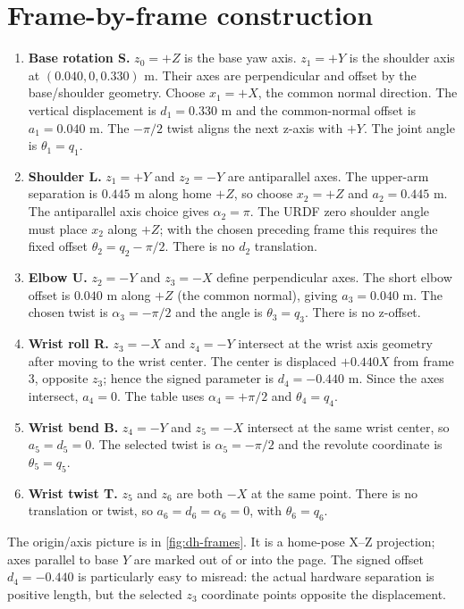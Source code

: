 \section{Frame-by-frame construction}
\begin{enumerate}[label=\textbf{Joint \arabic*:},leftmargin=*]
 \item \textbf{Base rotation S.} $z_0=+Z$ is the base yaw axis. $z_1=+Y$ is
 the shoulder axis at $(0.040,0,0.330)$ m. Their axes are perpendicular and
 offset by the base/shoulder geometry. Choose $x_1=+X$, the common normal
 direction. The vertical displacement is $d_1=0.330$ m and the common-normal
 offset is $a_1=0.040$ m. The $-\pi/2$ twist aligns the next z-axis with
 $+Y$. The joint angle is $\theta_1=q_1$.

 \item \textbf{Shoulder L.} $z_1=+Y$ and $z_2=-Y$ are antiparallel axes.
 The upper-arm separation is $0.445$ m along home $+Z$, so choose
 $x_2=+Z$ and $a_2=0.445$ m. The antiparallel axis choice gives
 $\alpha_2=\pi$. The URDF zero shoulder angle must place $x_2$ along $+Z$;
 with the chosen preceding frame this requires the fixed offset
 $\theta_2=q_2-\pi/2$. There is no $d_2$ translation.

 \item \textbf{Elbow U.} $z_2=-Y$ and $z_3=-X$ define perpendicular axes.
 The short elbow offset is $0.040$ m along $+Z$ (the common normal), giving
 $a_3=0.040$ m. The chosen twist is $\alpha_3=-\pi/2$ and the angle is
 $\theta_3=q_3$. There is no z-offset.

 \item \textbf{Wrist roll R.} $z_3=-X$ and $z_4=-Y$ intersect at the wrist
 axis geometry after moving to the wrist center. The center is displaced
 $+0.440X$ from frame 3, opposite $z_3$; hence the signed parameter is
 $d_4=-0.440$ m. Since the axes intersect, $a_4=0$. The table uses
 $\alpha_4=+\pi/2$ and $\theta_4=q_4$.

 \item \textbf{Wrist bend B.} $z_4=-Y$ and $z_5=-X$ intersect at the same
 wrist center, so $a_5=d_5=0$. The selected twist is $\alpha_5=-\pi/2$ and
 the revolute coordinate is $\theta_5=q_5$.

 \item \textbf{Wrist twist T.} $z_5$ and $z_6$ are both $-X$ at the same
 point. There is no translation or twist, so $a_6=d_6=\alpha_6=0$, with
 $\theta_6=q_6$.
\end{enumerate}

The origin/axis picture is in \cref{fig:dh-frames}. It is a home-pose X--Z
projection; axes parallel to base $Y$ are marked out of or into the page.
The signed offset $d_4=-0.440$ is particularly easy to misread: the actual
hardware separation is positive length, but the selected $z_3$ coordinate
points opposite the displacement.

